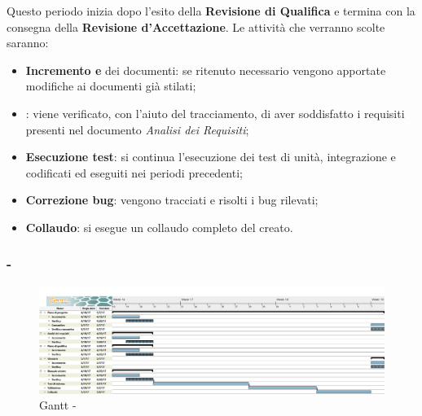 \documentclass[./PianoDiProgetto.tex]{subfiles}
\begin{document}
  Questo periodo inizia dopo l'esito della \textbf{Revisione di Qualifica} e termina con la consegna della \textbf{Revisione d'Accettazione}. Le attività che verranno scolte saranno:
  \begin{itemize}
    \item \textbf{Incremento e } dei documenti: se ritenuto necessario vengono apportate modifiche ai documenti già stilati;
    \item \textbf{}: viene verificato, con l'aiuto del tracciamento, di aver soddisfatto i requisiti presenti nel documento \textit{Analisi dei Requisiti};
    \item \textbf{Esecuzione test}: si continua l'esecuzione dei test di unità, integrazione e  codificati ed eseguiti nei periodi precedenti;
    \item \textbf{Correzione bug}: vengono tracciati e risolti i bug rilevati;
    \item \textbf{Collaudo}: si esegue un collaudo completo del  creato.
  \end{itemize}

  \subsubsection{ - \PerV}
    \begin{figure}[!h]
    \centering
    \includegraphics[width=\textwidth]{images/V}
    \caption{Gantt - \PerV}
    \end{figure}
\end{document}
